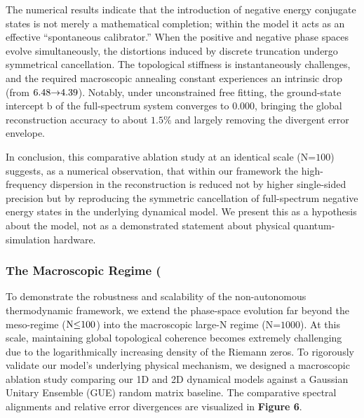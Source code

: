 \documentclass[fractalfract,article,submit,oneauthor,pdftex]{Definitions/mdpi}
\begin{document}
The numerical results indicate that the introduction
of negative energy conjugate states is not merely a mathematical
completion; within the model it acts as an effective ``spontaneous calibrator.''
When the positive and negative phase spaces evolve simultaneously, the
distortions induced by discrete truncation undergo symmetrical
cancellation. The topological stiffness is instantaneously challenges,
and the required macroscopic annealing constant experiences an intrinsic
drop (from \(\text{6.48\ensuremath{\rightarrow}4.39}\)). Notably, under
unconstrained free fitting, the ground-state intercept \(\text{b}\) of
the full-spectrum system converges to
\(\text{0.000}\), bringing the global reconstruction accuracy to about
\(\text{1.5\%}\) and largely removing the divergent error envelope.

In conclusion, this comparative ablation study at an identical scale
(\(\text{N}\text{=100}\)) suggests, as a numerical observation, that within
our framework the high-frequency dispersion in the reconstruction is
reduced not by higher single-sided precision but by reproducing the
symmetric cancellation of full-spectrum negative energy states in the
underlying dynamical model. We present this as a hypothesis about the
model, not as a demonstrated statement about physical quantum-simulation
hardware.

\subsubsection{The Macroscopic Regime (}

To demonstrate the robustness and scalability of the non-autonomous
thermodynamic framework, we extend the phase-space evolution far beyond
the meso-regime (\(\text{N}\text{\ensuremath{\le}100}\)) into the macroscopic
large-N regime (\(\text{N}\text{=1000}\)). At this scale,
maintaining global topological coherence becomes extremely challenging
due to the logarithmically increasing density of the Riemann zeros. To
rigorously validate our model's underlying physical mechanism, we
designed a macroscopic ablation study comparing our 1D and 2D dynamical
models against a Gaussian Unitary Ensemble (GUE) random matrix baseline.
The comparative spectral alignments and relative error divergences are
visualized in \textbf{Figure 6}.
\end{document}
